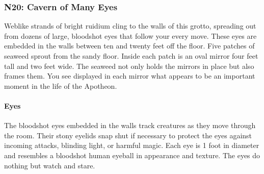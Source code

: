 \documentclass[10pt,a4,twoside,twocolumn,openany,nodeprecatedcode]{dndbook}
\begin{document}
\subsubsection{N20: Cavern of Many Eyes}
\begin{DndReadAloud}{}
Weblike strands of bright ruidium cling to the walls of this grotto, spreading out from dozens of large, bloodshot eyes that follow your every move. These eyes are embedded in the walls between ten and twenty feet off the floor.
Five patches of seaweed sprout from the sandy floor. Inside each patch is an oval mirror four feet tall and two feet wide. The seaweed not only holds the mirrors in place but also frames them. You see displayed in each mirror what appears to be an important moment in the life of the Apotheon.
\end{DndReadAloud}

\paragraph{Eyes}
The bloodshot eyes embedded in the walls track creatures as they move through the room. Their stony eyelids snap shut if necessary to protect the eyes against incoming attacks, blinding light, or harmful magic. Each eye is 1 foot in diameter and resembles a bloodshot human eyeball in appearance and texture. The eyes do nothing but watch and stare.
\end{document}
